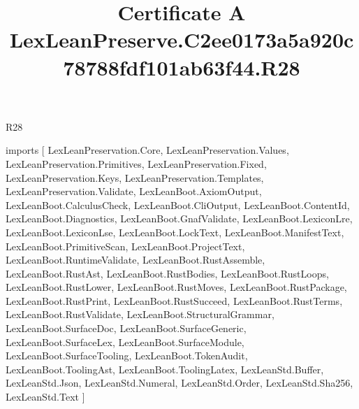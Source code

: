 \begin{lexlean}{R28}
\title{Certificate A LexLeanPreserve.C2ee0173a5a920c78788fdf101ab63f44.R28}
\begin{coremodule}
imports [
  LexLeanPreservation.Core,
  LexLeanPreservation.Values,
  LexLeanPreservation.Primitives,
  LexLeanPreservation.Fixed,
  LexLeanPreservation.Keys,
  LexLeanPreservation.Templates,
  LexLeanPreservation.Validate,
  LexLeanBoot.AxiomOutput,
  LexLeanBoot.CalculusCheck,
  LexLeanBoot.CliOutput,
  LexLeanBoot.ContentId,
  LexLeanBoot.Diagnostics,
  LexLeanBoot.GnafValidate,
  LexLeanBoot.LexiconLre,
  LexLeanBoot.LexiconLse,
  LexLeanBoot.LockText,
  LexLeanBoot.ManifestText,
  LexLeanBoot.PrimitiveScan,
  LexLeanBoot.ProjectText,
  LexLeanBoot.RuntimeValidate,
  LexLeanBoot.RustAssemble,
  LexLeanBoot.RustAst,
  LexLeanBoot.RustBodies,
  LexLeanBoot.RustLoops,
  LexLeanBoot.RustLower,
  LexLeanBoot.RustMoves,
  LexLeanBoot.RustPackage,
  LexLeanBoot.RustPrint,
  LexLeanBoot.RustSucceed,
  LexLeanBoot.RustTerms,
  LexLeanBoot.RustValidate,
  LexLeanBoot.StructuralGrammar,
  LexLeanBoot.SurfaceDoc,
  LexLeanBoot.SurfaceGeneric,
  LexLeanBoot.SurfaceLex,
  LexLeanBoot.SurfaceModule,
  LexLeanBoot.SurfaceTooling,
  LexLeanBoot.TokenAudit,
  LexLeanBoot.ToolingAst,
  LexLeanBoot.ToolingLatex,
  LexLeanStd.Buffer,
  LexLeanStd.Json,
  LexLeanStd.Numeral,
  LexLeanStd.Order,
  LexLeanStd.Sha256,
  LexLeanStd.Text
]


\end{coremodule}
\end{lexlean}

